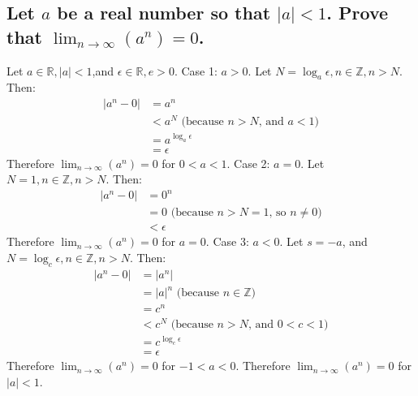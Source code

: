 \documentclass[10pt, letterpaper, titlepage]{article}
\newcommand{\0}{\varnothing}
\newcommand{\Z}{\mathbb{Z}}
\newcommand{\R}{\mathbb{R}}
\newcommand\abs[1]{\left|#1\right|}
\newcommand{\lntinf}{\lim_{n \to \infty}}
\newcommand{\1}{\{ 1 \}}
\newcommand{\2}{\{ (1,1) \}}
\newcommand{\e}{\epsilon}
\begin{document}
        \subsection{Let $a$ be a real number so that $\abs{a} < 1$. Prove that $\lntinf (a^n) = 0$.}
            Let $a \in \R, \abs{a} < 1$,and $\e \in \R, e > 0$.
            Case 1: $a > 0$. Let $N = \log_a\e, n \in \Z, n > N$.
            Then:
            \begin{align*}
                \abs{a^n - 0} &= a^n\\
                &< a^N \text{ (because $n > N$, and $a < 1$)}\\
                &= a^{\log_a{\e}}\\
                &= \e
            \end{align*}
            Therefore $\lntinf (a^n) = 0$ for $0 < a < 1$.
            Case 2: $a = 0$. Let $N = 1, n \in \Z, n > N$.
            Then:
            \begin{align*}
                \abs{a^n - 0} &= 0^n\\
                &= 0 \text{ (because $n > N = 1$, so $n \ne 0$)}\\
                &< \e
            \end{align*}
            Therefore $\lntinf (a^n) = 0$ for $a = 0$.
            Case 3: $a < 0$. Let $s = -a$, and $N = \log_c\e, n \in \Z, n > N$.
            Then:
            \begin{align*}
                \abs{a^n - 0} &= \abs{a^n}\\
                &= \abs{a}^n \text{ (because $n \in \Z$)}\\
                &= c^n\\
                &< c^N \text{ (because $n > N$, and $0 < c < 1$)}\\
                &= c^{\log_c{\e}}\\
                &= \e
            \end{align*}
            Therefore $\lntinf (a^n) = 0$ for $-1 < a < 0$.
            Therefore $\lntinf (a^n) = 0$ for $\abs{a} < 1$.
\end{document}
